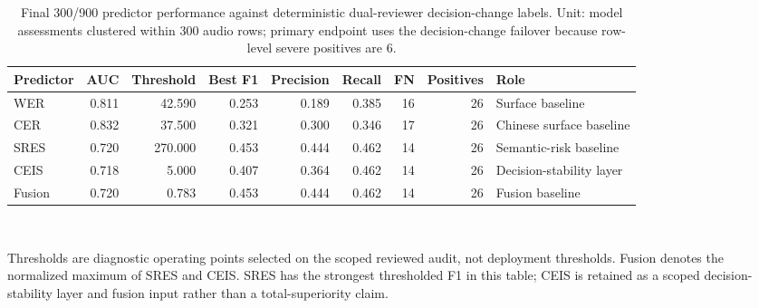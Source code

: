 \begin{table}[!htbp]
\centering
\caption{Final 300/900 predictor performance against deterministic dual-reviewer decision-change labels. Unit: model assessments clustered within 300 audio rows; primary endpoint uses the decision-change failover because row-level severe positives are 6.}
\label{tab:predictor}
\footnotesize
\begin{tabularx}{\linewidth}{@{}L{1.10}R{0.75}R{0.75}R{0.75}R{0.75}R{0.75}R{0.75}R{0.65}L{1.25}@{}}
\toprule
Predictor & AUC & Threshold & Best F1 & Precision & Recall & FN & Positives & Role \\
\midrule
WER & 0.811 & 42.590 & 0.253 & 0.189 & 0.385 & 16 & 26 & Surface baseline \\
CER & 0.832 & 37.500 & 0.321 & 0.300 & 0.346 & 17 & 26 & Chinese surface baseline \\
SRES & 0.720 & 270.000 & 0.453 & 0.444 & 0.462 & 14 & 26 & Semantic-risk baseline \\
CEIS & 0.718 & 5.000 & 0.407 & 0.364 & 0.462 & 14 & 26 & Decision-stability layer \\
Fusion & 0.720 & 0.783 & 0.453 & 0.444 & 0.462 & 14 & 26 & Fusion baseline \\
\bottomrule
\end{tabularx}
\\[0.4em]{\footnotesize\RaggedRight Thresholds are diagnostic operating points selected on the scoped reviewed audit, not deployment thresholds. Fusion denotes the normalized maximum of SRES and CEIS. SRES has the strongest thresholded F1 in this table; CEIS is retained as a scoped decision-stability layer and fusion input rather than a total-superiority claim.\par}
\end{table}
